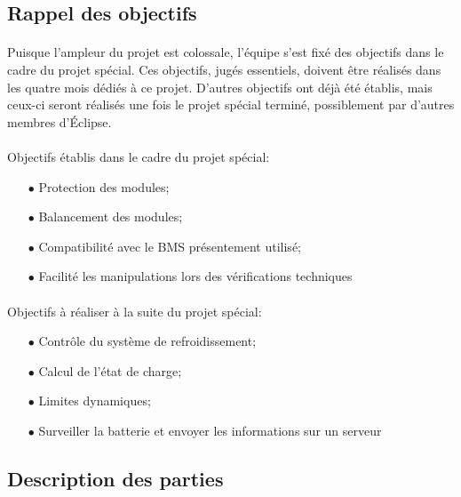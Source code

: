 	\subsection{Rappel des objectifs}
		\paragraph*{}		
		Puisque l'ampleur du projet est colossale, l'équipe s'est fixé des objectifs dans le cadre du projet spécial. Ces objectifs, jugés essentiels, doivent être réalisés dans les quatre mois dédiés à ce projet. D'autres objectifs ont déjà été établis, mais ceux-ci seront réalisés une fois le projet spécial terminé, possiblement par d'autres membres d'Éclipse.
		
		\paragraph*{}
		Objectifs établis dans le cadre du projet spécial:
		
			\begin{itemize}
				\item[$\bullet$] Protection des modules;
				\item[$\bullet$] Balancement des modules;
				\item[$\bullet$] Compatibilité avec le BMS présentement utilisé;
				\item[$\bullet$] Facilité les manipulations lors des vérifications techniques
			\end{itemize}
		
		\paragraph*{}	
		Objectifs à réaliser à la suite du projet spécial:
		
			\begin{itemize}
				\item[$\bullet$] Contrôle du système de refroidissement;
				\item[$\bullet$] Calcul de l'état de charge;
				\item[$\bullet$] Limites dynamiques;
				\item[$\bullet$] Surveiller la batterie et envoyer les informations sur un serveur
			\end{itemize}		
	
	\subsection{Description des parties}
